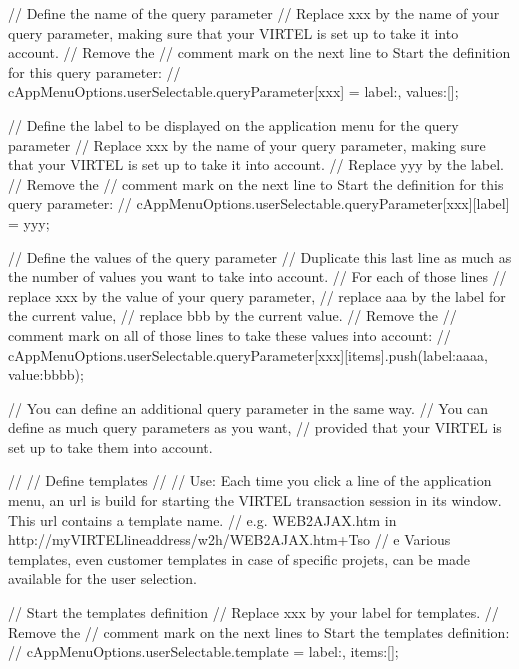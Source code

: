 \documentclass[letterpaper,10pt,english]{sphinxmanual}
\begin{document}
\begin{sphinxVerbatim}[commandchars=\\\{\}]
// \PYGZhy{} Define the name of the query parameter
// Replace xxx by the name of your query parameter, making sure that your VIRTEL is set up to take it into account.
// Remove the // comment mark on the next line to Start the definition for this query parameter:
// cAppMenuOptions.userSelectable.queryParameter[\PYGZdq{}xxx\PYGZdq{}] = \PYGZob{}\PYGZdq{}label\PYGZdq{}:\PYGZdq{}\PYGZdq{}, \PYGZdq{}values\PYGZdq{}:[]\PYGZcb{};

// \PYGZhy{} Define the label to be displayed on the application menu for the query parameter
// Replace xxx by the name of your query parameter, making sure that your VIRTEL is set up to take it into account.
// Replace yyy by the label.
// Remove the // comment mark on the next line to Start the definition for this query parameter:
// cAppMenuOptions.userSelectable.queryParameter[\PYGZdq{}xxx\PYGZdq{}][\PYGZdq{}label\PYGZdq{}] = \PYGZdq{}yyy\PYGZdq{};

// \PYGZhy{} Define the values of the query parameter
// Duplicate this last line as much as the number of values you want to take into account.
// For each of those lines
// \PYGZhy{} replace xxx by the value of your query parameter,
// \PYGZhy{} replace aaa by the label for the current value,
// \PYGZhy{} replace bbb by the current value.
// Remove the // comment mark on all of those lines to take these values into account:
// cAppMenuOptions.userSelectable.queryParameter[\PYGZdq{}xxx\PYGZdq{}][\PYGZdq{}items\PYGZdq{}].push(\PYGZob{}\PYGZdq{}label\PYGZdq{}:\PYGZdq{}aaaa\PYGZdq{}, \PYGZdq{}value\PYGZdq{}:\PYGZdq{}bbbb\PYGZdq{}\PYGZcb{});


// You can define an additional query parameter in the same way.
// You can define as much query parameters as you want,
// provided that your VIRTEL is set up to take them into account.



//
// Define templates
// \PYGZhy{}\PYGZhy{}\PYGZhy{}\PYGZhy{}\PYGZhy{}\PYGZhy{}\PYGZhy{}\PYGZhy{}\PYGZhy{}\PYGZhy{}\PYGZhy{}\PYGZhy{}\PYGZhy{}\PYGZhy{}\PYGZhy{}\PYGZhy{}
// Use: Each time you click a line of the application menu, an url is build for starting the VIRTEL transaction session in its window.  This url contains a template name.
// e.g. \PYGZdq{}WEB2AJAX.htm\PYGZdq{} in http://my\PYGZhy{}VIRTEL\PYGZhy{}line\PYGZhy{}address/w2h/WEB2AJAX.htm+Tso
// e Various templates, even customer templates in case of specific projets, can be made available for the user selection.

// \PYGZhy{} Start the templates definition
// Replace \PYGZdq{}xxx\PYGZdq{} by your label for templates.
// Remove the // comment mark on the next lines to Start the templates definition:
// cAppMenuOptions.userSelectable.template =  \PYGZob{}\PYGZdq{}label\PYGZdq{}:\PYGZdq{}\PYGZdq{}, \PYGZdq{}items\PYGZdq{}:[]\PYGZcb{};



\end{sphinxVerbatim}
\end{document}
